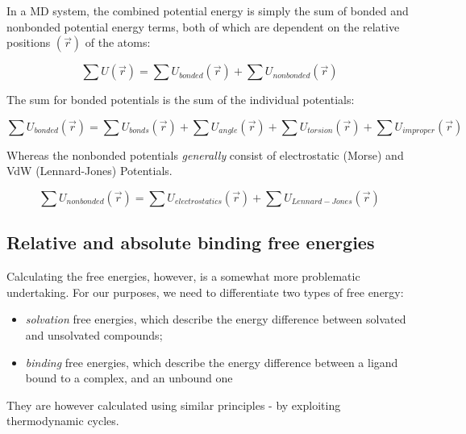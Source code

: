 \documentclass[oneside]{scrreprt}
\begin{document}
In a MD system, the combined potential energy is simply the sum of bonded and nonbonded potential energy terms, both of which are dependent on the relative positions $(\Vec{r})$ of the atoms:


\begin{equation}
    \sum U (\Vec{r}) = \sum U_{bonded} (\Vec{r}) + \sum U_{nonbonded} (\Vec{r})
\end{equation}

The sum for bonded potentials is the sum of the individual potentials:

\begin{equation}
    \sum U_{bonded} (\Vec{r})=\sum U_{bonds} (\Vec{r}) + \sum U_{angle} (\Vec{r}) + \sum U_{torsion} (\Vec{r}) +\sum U_{improper} (\Vec{r})
\end{equation}

Whereas the nonbonded potentials \emph{generally} consist of electrostatic (Morse) and VdW (Lennard-Jones) Potentials.

\begin{equation}
    \sum U_{nonbonded} (\Vec{r})=\sum U_{electrostatics} (\Vec{r}) + \sum U_{Lennard-Jones} (\Vec{r})
\end{equation}




\subsection{Relative and absolute binding free energies}

Calculating the free energies, however, is a somewhat more problematic undertaking. For our purposes, we need to differentiate two types of free energy:
\begin{itemize}
    \item \emph{solvation} free energies, which describe the energy difference between solvated and unsolvated compounds;
    \item \emph{binding} free energies, which describe the energy difference between a ligand bound to a complex, and an unbound one
\end{itemize}
They are however calculated using similar principles - by exploiting thermodynamic cycles.
\end{document}
